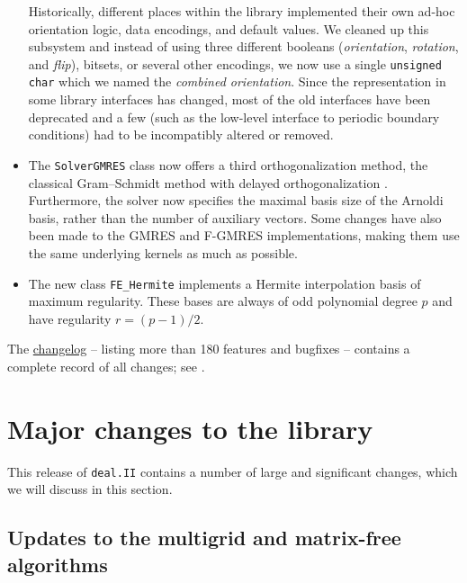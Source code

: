 \documentclass{ansarticle-preprint}
\newcommand{\specialword}[1]{\texttt{#1}}
\newcommand{\dealii}{{\specialword{deal.II}}\xspace}
\begin{document}
\begin{itemize}
    Historically, different places within the library implemented their own
    ad-hoc orientation logic, data encodings, and default values. We cleaned up
    this subsystem and instead of using three different booleans
    (\emph{orientation}, \emph{rotation}, and \emph{flip}), bitsets, or several
    other encodings, we now use a single \texttt{unsigned char} which we named the
    \emph{combined orientation}. Since the representation in some library
    interfaces has changed, most of the old interfaces have been deprecated and
    a few (such as the low-level interface to periodic boundary conditions) had
    to be incompatibly altered or removed.
\item The \texttt{SolverGMRES} class now offers a third orthogonalization
  method, the classical Gram--Schmidt method with delayed orthogonalization
  \cite{Bielich2022}. Furthermore, the solver now specifies the maximal basis
  size of the Arnoldi basis, rather than the number of auxiliary
  vectors. Some changes have also been made to the GMRES and F-GMRES
  implementations, making them use the same underlying kernels as much as possible.
\item The new class \texttt{FE\_Hermite} implements a Hermite interpolation basis of
  maximum regularity. These bases are always of odd polynomial degree $p$ and have
  regularity $r=(p-1)/2$.
\end{itemize}
%
The
\href{https://dealii.org/developer/doxygen/deal.II/changes_between_9_5_2_and_9_6_0.html}{changelog}
-- listing more than 180 features and bugfixes --
contains a complete record of all changes; see \cite{changes96}.

\section{Major changes to the library}
\label{sec:major}

This release of \dealii contains a number of large and significant changes,
which we will discuss in this section.



\subsection{Updates to the multigrid and matrix-free algorithms}\label{sec:mf}
\end{document}
